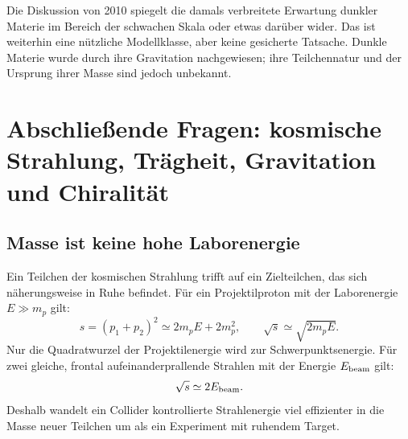 Die Diskussion von 2010 spiegelt die damals verbreitete Erwartung dunkler Materie im Bereich der schwachen Skala oder etwas darüber wider. Das ist weiterhin eine nützliche Modellklasse, aber keine gesicherte Tatsache. Dunkle Materie wurde durch ihre Gravitation nachgewiesen; ihre Teilchennatur und der Ursprung ihrer Masse sind jedoch unbekannt.

\section{Abschließende Fragen: kosmische Strahlung, Trägheit, Gravitation und Chiralität}

\subsection{Masse ist keine hohe Laborenergie}

\begin{classroomqa}
\end{classroomqa}

Ein Teilchen der kosmischen Strahlung trifft auf ein Zielteilchen, das sich näherungsweise in Ruhe befindet. Für ein Projektilproton mit der Laborenergie \(E\gg m_p\) gilt:
\begin{equation}
  s=(p_1+p_2)^2
  \simeq2m_pE+2m_p^2,
  \qquad
  \sqrt{s}\simeq\sqrt{2m_pE}.
  \label{eq:l09-fixed-target-s}
\end{equation}
Nur die Quadratwurzel der Projektilenergie wird zur Schwerpunktsenergie. Für zwei gleiche, frontal aufeinanderprallende Strahlen mit der Energie \(E_{\rm beam}\) gilt:
\begin{equation}
  \sqrt{s}\simeq2E_{\rm beam}.
  \label{eq:l09-collider-s}
\end{equation}
Deshalb wandelt ein Collider kontrollierte Strahlenergie viel effizienter in die Masse neuer Teilchen um als ein Experiment mit ruhendem Target.


